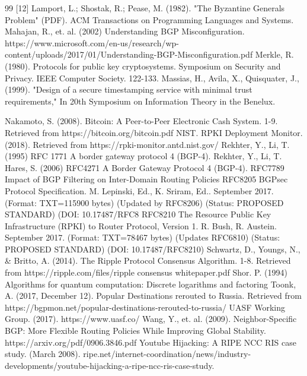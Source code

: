 \documentclass[letterpaper, 10 pt, conference]{ieeeconf}  %
\begin{document}
\begin{thebibliography}{99}
[12] Lamport, L.; Shostak, R.; Pease, M. (1982). "The Byzantine Generals Problem" (PDF). ACM Transactions on Programming Languages and Systems.
 Mahajan, R., et. al. (2002) Understanding BGP Misconfiguration. https://www.microsoft.com/en-us/research/wp-content/uploads/2017/01/Understanding-BGP-Misconfiguration.pdf
 Merkle, R. (1980). Protocols for public key cryptosystems. Symposium on Security and Privacy. IEEE Computer Society. 122-133.
 Massias, H., Avila, X., Quisquater, J., (1999). "Design of a secure timestamping service with minimal trust requirements," In 20th Symposium on Information Theory in the Benelux.

 Nakamoto, S. (2008). Bitcoin: A Peer-to-Peer Electronic Cash System.
1-9. Retrieved from https://bitcoin.org/bitcoin.pdf
 NIST. RPKI Deployment Monitor. (2018). Retrieved from https://rpki-monitor.antd.nist.gov/
 Rekhter, Y., Li, T. (1995) RFC 1771 A border gateway protocol 4 (BGP-4).
 Rekhter, Y., Li, T.  Hares, S. (2006) RFC4271 A Border Gateway Protocol 4 (BGP-4).
 RFC7789 Impact of BGP Filtering on Inter-Domain Routing Policies
 RFC8205 BGPsec Protocol Specification. M. Lepinski, Ed., K. Sriram, Ed..
     September 2017. (Format: TXT=115900 bytes) (Updated by RFC8206)
     (Status: PROPOSED STANDARD) (DOI: 10.17487/RFC8
 RFC8210 The Resource Public Key Infrastructure (RPKI) to Router Protocol,
     Version 1. R. Bush, R. Austein. September 2017. (Format: TXT=78467
     bytes) (Updates RFC6810) (Status: PROPOSED STANDARD) (DOI:
     10.17487/RFC8210)
 Schwartz, D., Youngs, N., \& Britto, A. (2014). The
Ripple Protocol Consensus Algorithm. 1-8. Retrieved from
https://ripple.com/files/ripple consensus whitepaper.pdf
 Shor. P. (1994) Algorithms for quantum computation: Discrete logarithms and factoring
 Toonk, A. (2017, December 12). Popular Destinations rerouted to Russia. Retrieved from https://bgpmon.net/popular-destinations-rerouted-to-russia/
 UASF Working Group. (2017). https://www.uasf.co/
 Wang, Y., et. al. (2009). Neighbor-Specific BGP: More Flexible Routing Policies While Improving Global Stability. https://arxiv.org/pdf/0906.3846.pdf
 Youtube Hijacking: A RIPE NCC RIS case study. (March 2008). ripe.net/internet-coordination/news/industry-developments/youtube-hijacking-a-ripe-ncc-ris-case-study.
\end{thebibliography}
\end{document}
